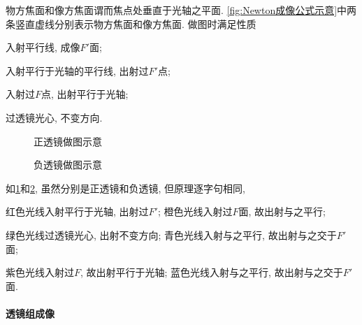 \documentclass{ctexart}
\begin{document}
物方焦面和像方焦面谓而焦点处垂直于光轴之平面. \cref{fig:Newton成像公式示意}中两条竖直虚线分别表示物方焦面和像方焦面. 做图时满足性质
\begin{cenum}
    \setcounter{enumi}{-1}
    \item 入射平行线, 成像$F'$面;
    \item 入射平行于光轴的平行线, 出射过$F'$点;
    \item 入射过$F$点, 出射平行于光轴;
    \item 过透镜光心, 不变方向.
\end{cenum}
\begin{figure}[ht]
    \centering
    \caption{正透镜做图示意}
    \label{fig:正透镜做图示意}
\end{figure}
\begin{figure}[ht]
    \centering
    \caption{负透镜做图示意}
    \label{fig:负透镜做图示意}
\end{figure}
\begin{sample}
    \begin{ex}
        如\cref{fig:正透镜做图示意}和\cref{fig:负透镜做图示意}, 虽然分别是正透镜和负透镜, 但原理逐字句相同,
        \begin{cenum}
            \item 红色光线入射平行于光轴, 出射过$F'$; 橙色光线入射过$F$面, 故出射与之平行;
            \item 绿色光线过透镜光心, 出射不变方向; 青色光线入射与之平行, 故出射与之交于$F'$面;
            \item 紫色光线入射过$F$, 故出射平行于光轴; 蓝色光线入射与之平行, 故出射与之交于$F'$面.
        \end{cenum}
    \end{ex}
\end{sample}


\paragraph{透镜组成像} %
\label{par:透镜组成像}
\end{document}
